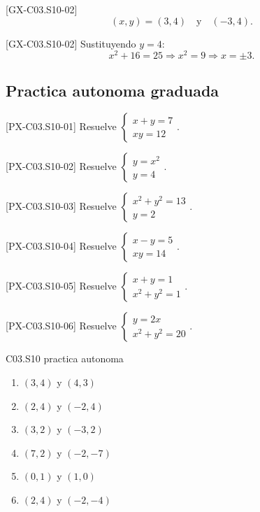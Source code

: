 \begin{shortanswer}{[GX-C03.S10-02]}
\[
(x,y)=(3,4)\quad \text{y}\quad (-3,4).
\]
\end{shortanswer}

\begin{fullsolution}{[GX-C03.S10-02]}
Sustituyendo \(y=4\):
\[
x^2+16=25 \Longrightarrow x^2=9 \Longrightarrow x=\pm 3.
\]
\end{fullsolution}

\subsection*{Practica autonoma graduada}
\begin{exercise}{[PX-C03.S10-01] Resuelve \(\begin{cases}x+y=7\\ xy=12\end{cases}\).}
\end{exercise}
\begin{exercise}{[PX-C03.S10-02] Resuelve \(\begin{cases}y=x^2\\ y=4\end{cases}\).}
\end{exercise}
\begin{exercise}{[PX-C03.S10-03] Resuelve \(\begin{cases}x^2+y^2=13\\ y=2\end{cases}\).}
\end{exercise}
\begin{exercise}{[PX-C03.S10-04] Resuelve \(\begin{cases}x-y=5\\ xy=14\end{cases}\).}
\end{exercise}
\begin{exercise}{[PX-C03.S10-05] Resuelve \(\begin{cases}x+y=1\\ x^2+y^2=1\end{cases}\).}
\end{exercise}
\begin{exercise}{[PX-C03.S10-06] Resuelve \(\begin{cases}y=2x\\ x^2+y^2=20\end{cases}\).}
\end{exercise}

\begin{shortanswer}{C03.S10 practica autonoma}
\begin{enumerate}[label=\textbf{PX-C03.S10-\arabic*:}, leftmargin=*]
  \item \((3,4)\) y \((4,3)\)
  \item \((2,4)\) y \((-2,4)\)
  \item \((3,2)\) y \((-3,2)\)
  \item \((7,2)\) y \((-2,-7)\)
  \item \((0,1)\) y \((1,0)\)
  \item \((2,4)\) y \((-2,-4)\)
\end{enumerate}
\end{shortanswer}

